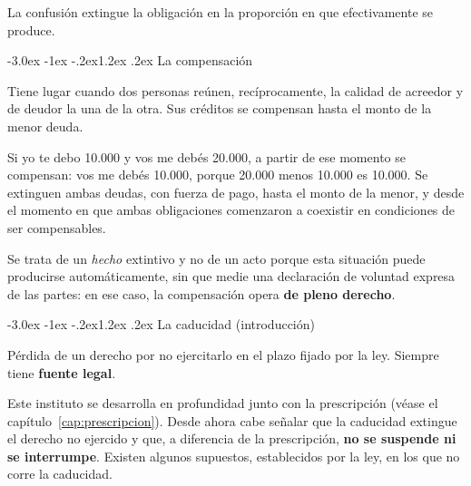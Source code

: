 \documentclass[12pt,oneside]{book}
\makeatletter
\renewcommand\section{\@startsection{section}{1}{\z@}%
  {-3.0ex \@plus -1ex \@minus -.2ex}{1.2ex \@plus .2ex}%
  {\normalfont\large\bfseries\color{acento}}}
\makeatother
\begin{document}
La confusión extingue la obligación en la proporción en que efectivamente se produce.

\section{La compensación}

\begin{definicion}[{Compensación}]
Tiene lugar cuando dos personas reúnen, recíprocamente, la calidad de acreedor y de deudor la una de la otra. Sus créditos se compensan hasta el monto de la menor deuda.
\end{definicion}

\begin{ejemplo}
Si yo te debo 10.000 y vos me debés 20.000, a partir de ese momento se compensan: vos me debés 10.000, porque 20.000 menos 10.000 es 10.000. Se extinguen ambas deudas, con fuerza de pago, hasta el monto de la menor, y desde el momento en que ambas obligaciones comenzaron a coexistir en condiciones de ser compensables.
\end{ejemplo}

Se trata de un \textit{hecho} extintivo y no de un acto porque esta situación puede producirse automáticamente, sin que medie una declaración de voluntad expresa de las partes: en ese caso, la compensación opera \textbf{de pleno derecho}.

\section{La caducidad (introducción)}

\begin{definicion}[{Caducidad}]
Pérdida de un derecho por no ejercitarlo en el plazo fijado por la ley. Siempre tiene \textbf{fuente legal}.
\end{definicion}

Este instituto se desarrolla en profundidad junto con la prescripción (véase el capítulo~\ref{cap:prescripcion}). Desde ahora cabe señalar que la caducidad extingue el derecho no ejercido y que, a diferencia de la prescripción, \textbf{no se suspende ni se interrumpe}. Existen algunos supuestos, establecidos por la ley, en los que no corre la caducidad.
\end{document}
